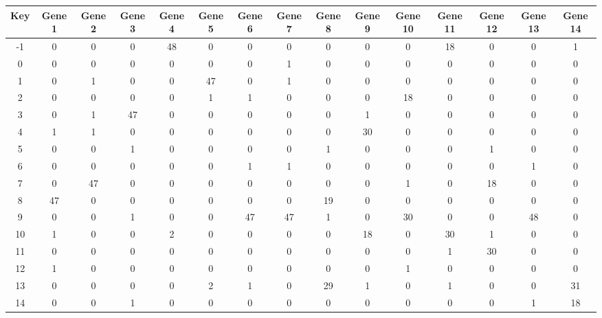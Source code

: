 \begin{tabular}{|c|c|c|c|c|c|c|c|c|c|c|c|c|c|c|}
\hline
Key & Gene 1 & Gene 2 & Gene 3 & Gene 4 & Gene 5 & Gene 6 & Gene 7 & Gene 8 & Gene 9 & Gene 10 & Gene 11 & Gene 12 & Gene 13 & Gene 14 \\
\hline
-1 & 0 & 0 & 0 & 48 & 0 & 0 & 0 & 0 & 0 & 0 & 18 & 0 & 0 & 1 \\
0 & 0 & 0 & 0 & 0 & 0 & 0 & 1 & 0 & 0 & 0 & 0 & 0 & 0 & 0 \\
1 & 0 & 1 & 0 & 0 & 47 & 0 & 1 & 0 & 0 & 0 & 0 & 0 & 0 & 0 \\
2 & 0 & 0 & 0 & 0 & 1 & 1 & 0 & 0 & 0 & 18 & 0 & 0 & 0 & 0 \\
3 & 0 & 1 & 47 & 0 & 0 & 0 & 0 & 0 & 1 & 0 & 0 & 0 & 0 & 0 \\
4 & 1 & 1 & 0 & 0 & 0 & 0 & 0 & 0 & 30 & 0 & 0 & 0 & 0 & 0 \\
5 & 0 & 0 & 1 & 0 & 0 & 0 & 0 & 1 & 0 & 0 & 0 & 1 & 0 & 0 \\
6 & 0 & 0 & 0 & 0 & 0 & 1 & 1 & 0 & 0 & 0 & 0 & 0 & 1 & 0 \\
7 & 0 & 47 & 0 & 0 & 0 & 0 & 0 & 0 & 0 & 1 & 0 & 18 & 0 & 0 \\
8 & 47 & 0 & 0 & 0 & 0 & 0 & 0 & 19 & 0 & 0 & 0 & 0 & 0 & 0 \\
9 & 0 & 0 & 1 & 0 & 0 & 47 & 47 & 1 & 0 & 30 & 0 & 0 & 48 & 0 \\
10 & 1 & 0 & 0 & 2 & 0 & 0 & 0 & 0 & 18 & 0 & 30 & 1 & 0 & 0 \\
11 & 0 & 0 & 0 & 0 & 0 & 0 & 0 & 0 & 0 & 0 & 1 & 30 & 0 & 0 \\
12 & 1 & 0 & 0 & 0 & 0 & 0 & 0 & 0 & 0 & 1 & 0 & 0 & 0 & 0 \\
13 & 0 & 0 & 0 & 0 & 2 & 1 & 0 & 29 & 1 & 0 & 1 & 0 & 0 & 31 \\
14 & 0 & 0 & 1 & 0 & 0 & 0 & 0 & 0 & 0 & 0 & 0 & 0 & 1 & 18 \\
\hline
\end{tabular}